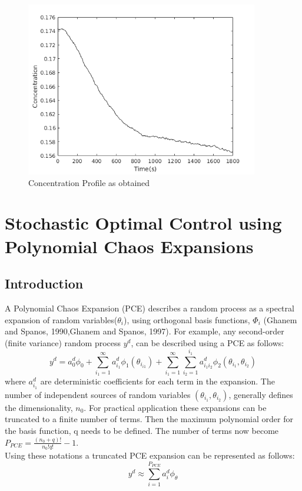 \begin{figure}[h!] 

\begin{center}
\includegraphics[width=4in]{Sconc.png}
\end{center}
\caption{Concentration Profile as obtained}
\end{figure}
\clearpage

\section{Stochastic Optimal Control using Polynomial Chaos Expansions}

\subsection{Introduction}
A Polynomial Chaos Expansion (PCE) describes a random process as a spectral expansion of random variables($\theta_{i}$), using orthogonal basis functions, $\Phi_{i}$ (Ghanem and Spanos, 1990,Ghanem and Spanos, 1997). For example, any second-order (finite variance) random process $y^{d}$, can be described using a PCE as follows:
\begin{equation}
y^{d} = a_{0}^{d}\phi_{0} + \sum_{i_{1}=1}^{\infty} a_{i_{1}}^{d}\phi_{1}(\theta_{i_{i1}}) + \sum_{i_{1}=1}^{\infty}\sum_{i_{2}=1}^{i_{1}} a_{i_{1}i_{2}}^d\phi_{2}(\theta_{i_{1}},\theta_{i_{2}})
\end{equation}
where $a_{i_{1}}^d$  are deterministic coefficients for each term in the expansion. The number of independent sources of random variables $(\theta_{i_{1}}, \theta_{i_{2}})$, generally defines the dimensionality, $n_{0}$. For practical application these expansions can be
truncated to a finite number of terms. Then the maximum polynomial order for the basis function, q needs to be defined.
The number of terms now become $P_{PCE} = \frac{(n_{0}+q)!}{n_{0}!q!} -1 $. \\
Using these notations a truncated PCE expansion can be represented as follows:
\begin{equation} 
\label{poly}
y^{d} \approx \sum_{i=1}^{P_{PCE}} a_{i}^{d}\phi_{\theta}
\end{equation}


